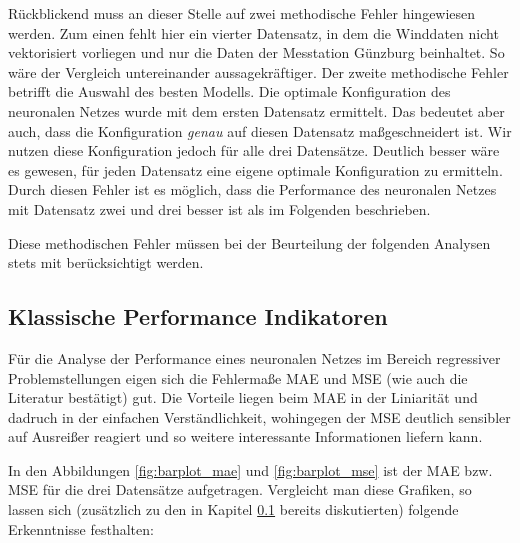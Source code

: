 \documentclass[
12pt, %
toc=listofnumbered, %
toc=chapterentrydotfill, %
numbers=noenddot, %
captions=tableheading, %
bibliography=numbered
]{scrreprt}
\let\Oldsubsection\subsection
\renewcommand{\subsection}{\FloatBarrier\Oldsubsection}
\newcommand{\qm}[1]{\glqq#1\grqq{}} %
\begin{document}
Rückblickend muss an dieser Stelle auf zwei methodische Fehler hingewiesen werden. Zum einen fehlt hier ein vierter Datensatz, in dem die Winddaten nicht vektorisiert vorliegen und nur die Daten der Messtation Günzburg beinhaltet. So wäre der Vergleich untereinander aussagekräftiger. Der zweite methodische Fehler betrifft die Auswahl des besten Modells. Die optimale Konfiguration des neuronalen Netzes wurde mit dem ersten Datensatz ermittelt. Das bedeutet aber auch, dass die Konfiguration \textit{genau} auf diesen Datensatz \qm{maßgeschneidert} ist. Wir nutzen diese Konfiguration jedoch für alle drei Datensätze. Deutlich besser wäre es gewesen, für jeden Datensatz eine eigene optimale Konfiguration zu ermitteln. Durch diesen Fehler ist es möglich, dass die Performance des neuronalen Netzes mit Datensatz zwei und drei besser ist als im Folgenden beschrieben.

Diese methodischen Fehler müssen bei der Beurteilung der folgenden Analysen stets mit berücksichtigt werden.

\subsection{Klassische Performance Indikatoren}\label{section:klassische_perf_indi}
Für die Analyse der Performance eines neuronalen Netzes im Bereich regressiver Problemstellungen eigen sich die Fehlermaße MAE und MSE (wie auch die Literatur bestätigt) gut. Die Vorteile liegen beim MAE in der Liniarität und dadruch in der einfachen Verständlichkeit, wohingegen der MSE deutlich sensibler auf Ausreißer reagiert und so weitere interessante Informationen liefern kann.

In den Abbildungen \ref{fig:barplot_mae} und \ref{fig:barplot_mse} ist der MAE bzw. MSE für die drei Datensätze aufgetragen. Vergleicht man diese Grafiken, so lassen sich (zusätzlich zu den in Kapitel \ref{section:klassische_perf_indi} bereits diskutierten) folgende Erkenntnisse festhalten:
\end{document}
